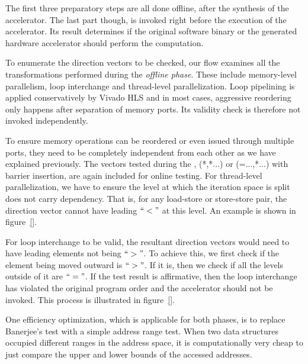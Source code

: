 The first three preparatory steps are all done offline,  after the synthesis of the accelerator. The last part though, is invoked right before the execution of the
accelerator. Its result determines if the original software binary or the generated
hardware accelerator should perform the computation.

To enumerate the direction vectors to be checked, our flow examines all the 
transformations performed during the \textit{offline phase}. These 
include memory-level parallelism, loop interchange and thread-level parallelization. Loop pipelining is
applied conservatively by Vivado HLS and in most cases, aggressive reordering only happens after separation of memory ports. Its validity check is therefore not invoked independently.  

To ensure memory operations can be reordered or even issued through multiple ports, they need to be completely independent from each other as we have explained previously. The vectors tested during the , (*,*...) or (=...,*...) with barrier insertion, are again included for online testing. For thread-level parallelization,
we have to ensure the level at which the iteration space is split does not carry dependency. That is, for any load-store or store-store pair, the direction vector
cannot have leading $``<"$ at this level. An example is shown in figure~\ref{}.

For loop interchange to be valid, the resultant direction vectors would need to have
leading elements not being $``>"$. To achieve this, we first check if the element being moved outward is $``>"$. If it is, then we check if all the levels outside of it are $``="$. If the test result is affirmative, then the loop interchange has violated the 
original program order and the accelerator should not be invoked. This process
is illustrated in figure~\ref{}.

One efficiency optimization, which
is applicable for both phases, is to replace Banerjee's test with a simple address range test. When two data structures occupied different ranges in the address space, it is
computationally very cheap to just compare the upper and lower bounds of the accessed
addresses.

